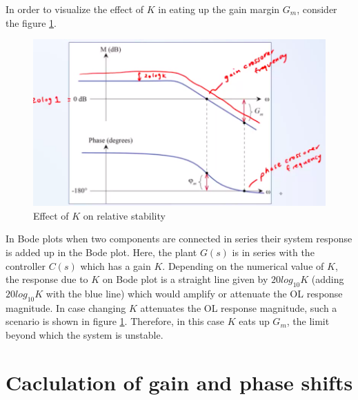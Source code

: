 In order to visualize the effect of $K$ in eating up the gain margin $G_m$, consider the figure \ref{Fig_FrequencyResp_K4Gm}.
\begin{figure}[h!]
	\centering
	\includegraphics[width=\linewidth]{Bilder/FrequencyResp_K4Gm}
	\caption{Effect of $K$ on relative stability}
	\label{Fig_FrequencyResp_K4Gm}
\end{figure}
In Bode plots when two components are connected in series their system response is added up in the Bode plot. Here, the plant $G(s)$ is in series with the controller $C(s)$ which has a gain $K$. Depending on the numerical value of $K$, the response due to $K$ on Bode plot is a straight line given by $20 log_{10}K$ (adding $20 log_{10}K$ with the blue line) which would amplify or attenuate the OL response magnitude. In case changing $K$ attenuates the OL response magnitude, such a scenario is shown in figure \ref{Fig_FrequencyResp_K4Gm}. Therefore, in this case $K$ eats up $G_m$, the limit beyond which the system is unstable.

\section{Caclulation of gain and phase shifts}

